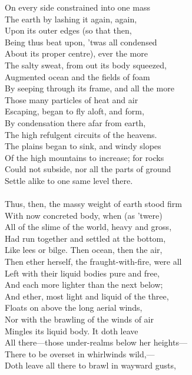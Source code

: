 On every side constrained into one mass\\
The earth by lashing it again, again,\\
Upon its outer edges (so that then,\\
Being thus beat upon, 'twas all condensed\\
About its proper centre), ever the more\\
The salty sweat, from out its body squeezed,\\
Augmented ocean and the fields of foam\\
By seeping through its frame, and all the more\\
Those many particles of heat and air\\
Escaping, began to fly aloft, and form,\\
By condensation there afar from earth,\\
The high refulgent circuits of the heavens.\\
The plains began to sink, and windy slopes\\
Of the high mountains to increase; for rocks\\
Could not subside, nor all the parts of ground\\
Settle alike to one same level there.\\
\\
Thus, then, the massy weight of earth stood firm\\
With now concreted body, when (as 'twere)\\
All of the slime of the world, heavy and gross,\\
Had run together and settled at the bottom,\\
Like lees or bilge. Then ocean, then the air,\\
Then ether herself, the fraught-with-fire, were all\\
Left with their liquid bodies pure and free,\\
And each more lighter than the next below;\\
And ether, most light and liquid of the three,\\
Floats on above the long aerial winds,\\
Nor with the brawling of the winds of air\\
Mingles its liquid body. It doth leave\\
All there—those under-realms below her heights—\\
There to be overset in whirlwinds wild,—\\
Doth leave all there to brawl in wayward gusts,\\
